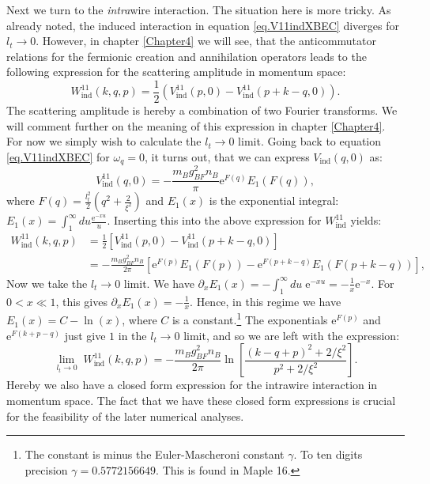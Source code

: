 Next we turn to the \textit{intra}wire interaction. The situation here is more tricky. As already noted, the induced interaction in equation \eqref{eq.V11indXBEC} diverges for $l_t \to 0$. However, in chapter \ref{Chapter4} we will see, that the anticommutator relations for the fermionic creation and annihilation operators leads to the following expression for the scattering amplitude in momentum space:
\begin{equation}
W^{11}_{\text{ind}}(k, q, p) = \frac{1}{2}\left(V^{11}_{\text{ind}}\left( p, 0 \right) - V^{11}_\text{ind}\left( p + k - q, 0 \right) \right). 
\label{eq.Wkqp.scattering.amplitude}
\end{equation}
The scattering amplitude is hereby a combination of two Fourier transforms. We will comment further on the meaning of this expression in chapter \ref{Chapter4}. For now we simply wish to calculate the $l_t \to 0$ limit. Going back to equation \eqref{eq.V11indXBEC} for $\omega_q = 0$, it turns out, that we can express $V_\text{ind}\left( q, 0 \right)$ as:
\begin{equation}
V^{11}_{\text{ind}}(q, 0) = -\frac{m_Bg_{BF}^2n_B}{\pi} \text{e}^{F(q)} E_1(F(q)),
\label{eq.V11indq.zerofrequency.ltnonzero}
\end{equation}
where $F(q) = \frac{l_t^2}{2}\left(q^2 + \frac{2}{\xi^2} \right)$ and $E_1(x)$ is the exponential integral: $E_1(x) = \int_1^\infty du \frac{\text{e}^{-xu}}{u}$. Inserting this into the above expression for $W^{11}_{\text{ind}}$ yields:
\begin{align}
W^{11}_{\text{ind}}(k, q, p) &= \frac{1}{2}\left[V^{11}_\text{ind}(p, 0) - V^{11}_\text{ind}(p + k - q, 0)\right] \nonumber \\
&= -\frac{m_Bg_{BF}^2n_B}{2\pi}\left[ \text{e}^{F(p)} E_1(F(p)) - \text{e}^{F(p + k - q)} E_1(F(p + k - q)) \right], \nonumber
\end{align}
Now we take the $l_t \to 0$ limit. We have $\partial_x E_1(x) = -\int_1^{\infty}du\; \text{e}^{-xu} = -\frac{1}{x}\text{e}^{-x}$. For $0 < x \ll 1$, this gives $\partial_xE_1(x) = -\frac{1}{x}$. Hence, in this regime we have $E_1(x) = C -\ln(x)$, where $C$ is a constant.\footnote{The constant is minus the Euler-Mascheroni constant $\gamma$. To ten digits precision $\gamma = 0.5772156649$. This is found in Maple 16.} The exponentials $\text{e}^{F(p)}$ and $\text{e}^{F(k + p - q)}$ just give $1$ in the $l_t \to 0$ limit, and so we are left with the expression:
\begin{equation}
\lim_{l_t \to 0} \; W^{11}_{\text{ind}}(k, q, p) = -\frac{m_Bg_{BF}^2n_B}{2\pi} \ln\left[\frac{(k - q + p)^2 + 2/\xi^2}{p^2 + 2/\xi^2}\right].
\label{eq.Wkqp.scattering.amplitude.lt=0} 
\end{equation}
Hereby we also have a closed form expression for the intrawire interaction in momentum space. The fact that we have these closed form expressions is crucial for the feasibility of the later numerical analyses.




